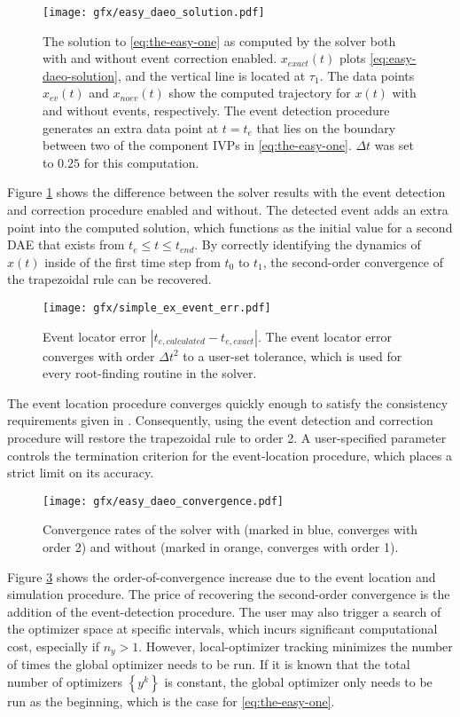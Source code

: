 \documentclass[twoside,leqno, twocolumn]{article}
\newcommand{\abs}[1]{\ensuremath{\left|#1\right|}}
\begin{document}
\begin{figure}[tb]
	\centering
	\texttt{[image: gfx/easy\_daeo\_solution.pdf]}
	\caption{The solution to \eqref{eq:the-easy-one} as computed by the solver both with and without event correction enabled. $x_{exact}(t)$ plots \eqref{eq:easy-daeo-solution}, and the vertical line is located at $\tau_1$. The data points $x_{ev}(t)$ and $x_{noev}(t)$ show the computed trajectory for $x(t)$ with and without events, respectively.  The event detection procedure generates an extra data point at $t={t_e}$ that lies on the boundary between two of the component IVPs in \eqref{eq:the-easy-one}. $\Delta t$ was set to $0.25$ for this computation.}
	\label{fig:easy-example-solution}
\end{figure}
Figure \ref{fig:easy-example-solution} shows the difference between the solver results with the event detection and correction procedure enabled and without. The detected event adds an extra point into the computed solution, which functions as the initial value for a second DAE that exists from $t_{e} \leq t \leq t_{end}$. By correctly identifying the dynamics of $x(t)$ inside of the first time step from $t_0$ to $t_1$, the second-order convergence of the trapezoidal rule can be recovered.

\begin{figure}[h]
	\centering
	\texttt{[image: gfx/simple\_ex\_event\_err.pdf]}
	\caption{Event locator error $\abs{t_{e, calculated} - t_{e, exact}}$. The event locator error converges with order $\Delta t^2$ to a user-set tolerance, which is used for every root-finding routine in the solver.}
	\label{fig:easy-event-location}
\end{figure}
The event location procedure converges quickly enough to satisfy the consistency requirements given in \cite{mannshardtOnestepMethodsAny1978}. Consequently, using the event detection and correction procedure will restore the trapezoidal rule to order 2. A user-specified parameter controls the termination criterion for the event-location procedure, which places a strict limit on its accuracy.

\begin{figure}[h]
	\centering
	\texttt{[image: gfx/easy\_daeo\_convergence.pdf]}
	\caption{Convergence rates of the solver with (marked in blue, converges with order 2) and without (marked in orange, converges with order 1).}
	\label{fig:easy-error-improvement}
\end{figure}
Figure \ref{fig:easy-error-improvement} shows the order-of-convergence increase due to the event location and simulation procedure. The price of recovering the second-order convergence is the addition of the event-detection procedure. The user may also trigger a search of the optimizer space at specific intervals, which incurs significant computational cost, especially if $n_y > 1$. However, local-optimizer tracking minimizes the number of times the global optimizer needs to be run. If it is known that the total number of optimizers $\left\{y^k\right\}$ is constant, the global optimizer only needs to be run as the beginning, which is the case for \eqref{eq:the-easy-one}.
\end{document}
